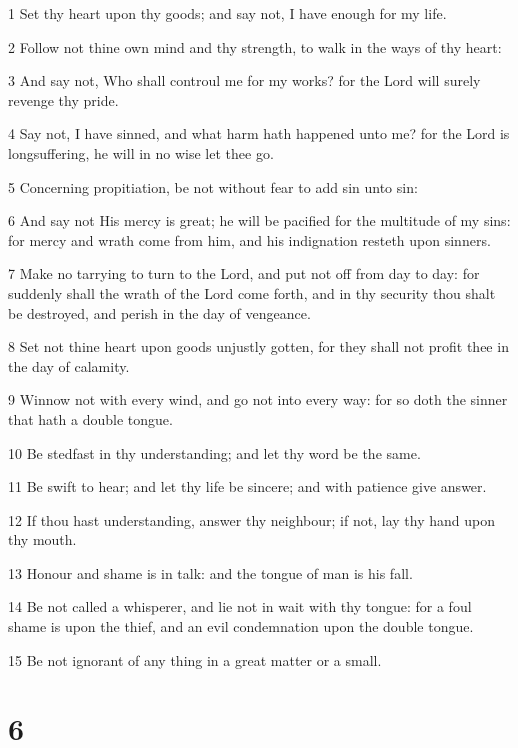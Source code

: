 \par 1 Set thy heart upon thy goods; and say not, I have enough for my life.
\par 2 Follow not thine own mind and thy strength, to walk in the ways of thy heart:
\par 3 And say not, Who shall controul me for my works? for the Lord will surely revenge thy pride.
\par 4 Say not, I have sinned, and what harm hath happened unto me? for the Lord is longsuffering, he will in no wise let thee go.
\par 5 Concerning propitiation, be not without fear to add sin unto sin:
\par 6 And say not His mercy is great; he will be pacified for the multitude of my sins: for mercy and wrath come from him, and his indignation resteth upon sinners.
\par 7 Make no tarrying to turn to the Lord, and put not off from day to day: for suddenly shall the wrath of the Lord come forth, and in thy security thou shalt be destroyed, and perish in the day of vengeance.
\par 8 Set not thine heart upon goods unjustly gotten, for they shall not profit thee in the day of calamity.
\par 9 Winnow not with every wind, and go not into every way: for so doth the sinner that hath a double tongue.
\par 10 Be stedfast in thy understanding; and let thy word be the same.
\par 11 Be swift to hear; and let thy life be sincere; and with patience give answer.
\par 12 If thou hast understanding, answer thy neighbour; if not, lay thy hand upon thy mouth.
\par 13 Honour and shame is in talk: and the tongue of man is his fall.
\par 14 Be not called a whisperer, and lie not in wait with thy tongue: for a foul shame is upon the thief, and an evil condemnation upon the double tongue.
\par 15 Be not ignorant of any thing in a great matter or a small.

\chapter{6}

